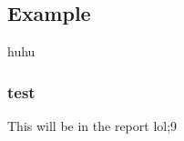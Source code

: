 \documentclass[../report.tex]{subfiles}
\begin{document}
\subsection{Example}
huhu
\subsubsection{test}




 This will be in the report lol;9
\end{document}
